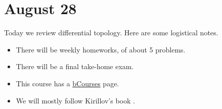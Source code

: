 \documentclass[../notes.tex]{subfiles}
\begin{document}
\section{August 28}

Today we review differential topology. Here are some logistical notes.
\begin{itemize}
	\item There will be weekly homeworks, of about 5 problems.
	\item There will be a final take-home exam.
	\item This course has a \href{https://bcourses.berkeley.edu/courses/1537579}{bCourses} page.
	\item We will mostly follow Kirillov's book \cite{kirillov-lie-algebra}.
\end{itemize}
\end{document}
